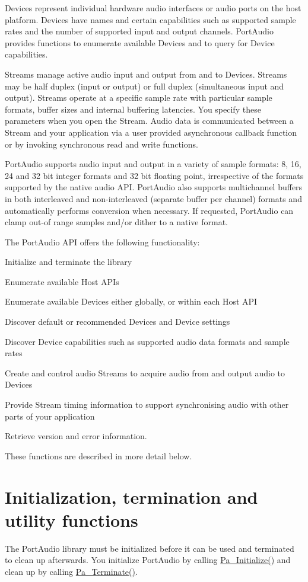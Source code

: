 Devices represent individual hardware audio interfaces or audio ports on the host platform. Devices have names and certain capabilities such as supported sample rates and the number of supported input and output channels. Port\+Audio provides functions to enumerate available Devices and to query for Device capabilities.

Streams manage active audio input and output from and to Devices. Streams may be half duplex (input or output) or full duplex (simultaneous input and output). Streams operate at a specific sample rate with particular sample formats, buffer sizes and internal buffering latencies. You specify these parameters when you open the Stream. Audio data is communicated between a Stream and your application via a user provided asynchronous callback function or by invoking synchronous read and write functions.

Port\+Audio supports audio input and output in a variety of sample formats\+: 8, 16, 24 and 32 bit integer formats and 32 bit floating point, irrespective of the formats supported by the native audio A\+PI. Port\+Audio also supports multichannel buffers in both interleaved and non-\/interleaved (separate buffer per channel) formats and automatically performs conversion when necessary. If requested, Port\+Audio can clamp out-\/of range samples and/or dither to a native format.

The Port\+Audio A\+PI offers the following functionality\+:
\begin{DoxyItemize}
\item Initialize and terminate the library
\item Enumerate available Host A\+P\+Is
\item Enumerate available Devices either globally, or within each Host A\+PI
\item Discover default or recommended Devices and Device settings
\item Discover Device capabilities such as supported audio data formats and sample rates
\item Create and control audio Streams to acquire audio from and output audio to Devices
\item Provide Stream timing information to support synchronising audio with other parts of your application
\item Retrieve version and error information.
\end{DoxyItemize}

These functions are described in more detail below.\hypertarget{api_overview_top_level_functions}{}\section{Initialization, termination and utility functions}\label{api_overview_top_level_functions}
The Port\+Audio library must be initialized before it can be used and terminated to clean up afterwards. You initialize Port\+Audio by calling \hyperlink{portaudio_8h_abed859482d156622d9332dff9b2d89da}{Pa\+\_\+\+Initialize()} and clean up by calling \hyperlink{portaudio_8h_a0db317604e916e8bd6098e60e6237221}{Pa\+\_\+\+Terminate()}.


